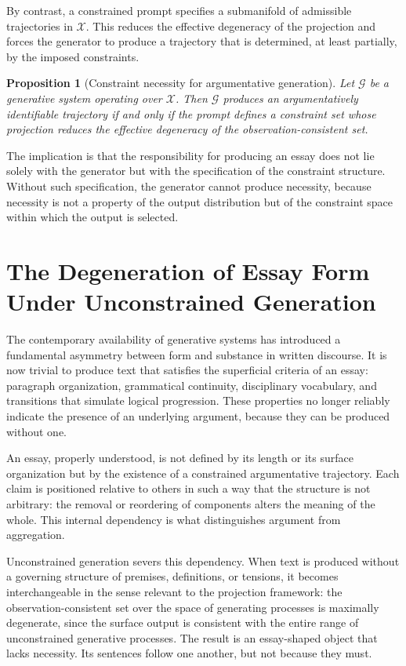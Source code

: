 \documentclass[12pt, oneside]{article}
\theoremstyle{plain}
\newtheorem{proposition}[theorem]{Proposition}
\theoremstyle{definition}
\theoremstyle{remark}
\newcommand{\config}{\mathcal{X}}
\begin{document}
By contrast, a constrained prompt specifies a submanifold of admissible trajectories in
$\config$. This reduces the effective degeneracy of the projection and forces the generator
to produce a trajectory that is determined, at least partially, by the imposed constraints.

\begin{proposition}[Constraint necessity for argumentative generation]
Let $\mathcal{G}$ be a generative system operating over $\config$. Then $\mathcal{G}$
produces an argumentatively identifiable trajectory if and only if the prompt defines a
constraint set whose projection reduces the effective degeneracy of the observation-consistent
set.
\end{proposition}

The implication is that the responsibility for producing an essay does not lie solely with
the generator but with the specification of the constraint structure. Without such
specification, the generator cannot produce necessity, because necessity is not a property
of the output distribution but of the constraint space within which the output is selected.

\section{The Degeneration of Essay Form Under Unconstrained Generation}

The contemporary availability of generative systems has introduced a fundamental asymmetry
between form and substance in written discourse. It is now trivial to produce text that
satisfies the superficial criteria of an essay: paragraph organization, grammatical
continuity, disciplinary vocabulary, and transitions that simulate logical progression.
These properties no longer reliably indicate the presence of an underlying argument,
because they can be produced without one.

An essay, properly understood, is not defined by its length or its surface organization
but by the existence of a constrained argumentative trajectory. Each claim is positioned
relative to others in such a way that the structure is not arbitrary: the removal or
reordering of components alters the meaning of the whole. This internal dependency is what
distinguishes argument from aggregation.

Unconstrained generation severs this dependency. When text is produced without a governing
structure of premises, definitions, or tensions, it becomes interchangeable in the sense
relevant to the projection framework: the observation-consistent set over the space of
generating processes is maximally degenerate, since the surface output is consistent with
the entire range of unconstrained generative processes. The result is an essay-shaped
object that lacks necessity. Its sentences follow one another, but not because they must.
\end{document}
